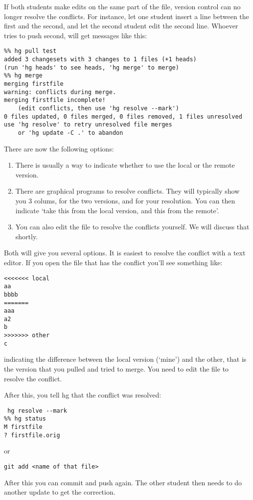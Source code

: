 If both students make edits on the same part of the file, version
control can no
longer resolve the conflicts. For instance, let one student insert a
line between the first and the second, and let the second student edit
the second line. Whoever tries to push second, will get messages
like this:
{\small
\begin{verbatim}
%% hg pull test
added 3 changesets with 3 changes to 1 files (+1 heads)
(run 'hg heads' to see heads, 'hg merge' to merge)
%% hg merge
merging firstfile
warning: conflicts during merge.
merging firstfile incomplete! 
    (edit conflicts, then use 'hg resolve --mark')
0 files updated, 0 files merged, 0 files removed, 1 files unresolved
use 'hg resolve' to retry unresolved file merges 
    or 'hg update -C .' to abandon
\end{verbatim}
}
There are now the following options:
\begin{enumerate}
\item There is usually a way to indicate whether to use the local or
  the remote version.
\item There are graphical programs to resolve conflicts. They will
  typically show you 3 colums, for the two versions, and for your
  resolution. You can then indicate `take this from the local version,
  and this from the remote'.
\item You can also edit the file to resolve the conflicts yourself. We
  will discuss that shortly.
\end{enumerate}

Both  will give you several options. It is easiest to resolve the
conflict with a text editor. If you open the file that has the conflict
you'll see something like:
\begin{verbatim}
<<<<<<< local
aa
bbbb
=======
aaa
a2
b
>>>>>>> other
c
\end{verbatim}
indicating the difference between the local version (`mine') and the
other, that is the version that you pulled and tried to merge.
You need to edit the file to resolve the conflict.

After this, you tell hg that the conflict was resolved:
\begin{verbatim}
 hg resolve --mark
%% hg status
M firstfile
? firstfile.orig
\end{verbatim}
or
\begin{verbatim}
git add <name of that file>
\end{verbatim}
After this you can commit and push again.
The other student then needs to do another update to get the
correction.

